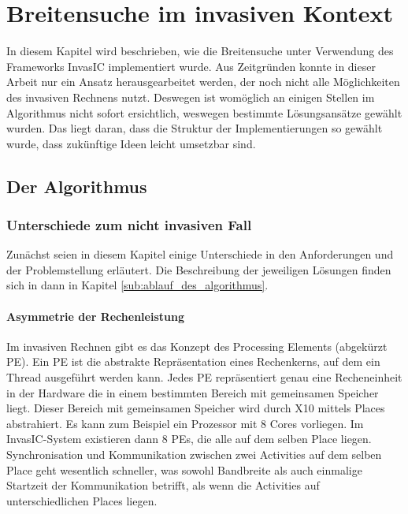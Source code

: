 
\chapter{Breitensuche im invasiven Kontext} %
\label{cha:breitensuche_im_invasiven_kontext}
In diesem Kapitel wird beschrieben, wie die Breitensuche unter Verwendung des Frameworks InvasIC implementiert wurde. Aus Zeitgründen konnte in dieser Arbeit nur ein Ansatz herausgearbeitet werden, der noch nicht alle Möglichkeiten des invasiven Rechnens nutzt. Deswegen ist womöglich an einigen Stellen im Algorithmus nicht sofort ersichtlich, weswegen bestimmte Lösungsansätze gewählt wurden. Das liegt daran, dass die Struktur der Implementierungen so gewählt wurde, dass zukünftige Ideen leicht umsetzbar sind.

\section{Der Algorithmus} %
\label{sec:der_algorithmus}

\subsection{Unterschiede zum nicht invasiven Fall} %
\label{sub:unterschiede_zum_nicht_invasiven_fall}
Zunächst seien in diesem Kapitel einige Unterschiede in den Anforderungen und der Problemstellung erläutert. Die Beschreibung der jeweiligen Lösungen finden sich in dann in Kapitel \ref{sub:ablauf_des_algorithmus}.

\subsubsection{Asymmetrie der Rechenleistung} %
\label{ssub:asymmetrie_der_rechenleistung}
Im invasiven Rechnen gibt es das Konzept des Processing Elements (abgekürzt PE). Ein PE ist die abstrakte Repräsentation eines Rechenkerns, auf dem ein Thread ausgeführt werden kann. Jedes PE repräsentiert genau eine Recheneinheit in der Hardware die in einem bestimmten Bereich mit gemeinsamen Speicher liegt. Dieser Bereich mit gemeinsamen Speicher wird durch X10 mittels Places abstrahiert. Es kann zum Beispiel ein Prozessor mit 8 Cores vorliegen. Im InvasIC-System existieren dann 8 PEs, die alle auf dem selben Place liegen. Synchronisation und Kommunikation zwischen zwei Activities auf dem selben Place geht wesentlich schneller, was sowohl Bandbreite als auch einmalige Startzeit der Kommunikation betrifft, als wenn die Activities auf unterschiedlichen Places liegen. 

